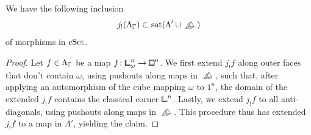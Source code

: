 \begin{lemma}\label{lem:different-liftings-comparison}
We have the following inclusion
\[
    j_!(\Lambda_{\bbGamma})\subset\mathrm{sat}(\Lambda'\cup\bprism)
\]
of morphisms in $\mathrm{cSet}$.
\end{lemma}

\begin{proof}
Let $f\in\Lambda_{\bbGamma}$ be a map $f\colon{\bbcor}^n_\omega\to{\bblox}^n$.
We first extend $j_!f$ along outer faces that don't contain $\omega$,
using pushouts along maps in $\bprism$,
such that, after applying an automorphism of the cube mapping $\omega$ to $1^n$,
the domain of the extended $j_!f$ contains the classical corner ${\bbcor}^n$.
Lastly, we extend $j_!f$ to all anti-diagonals, using pushouts along maps in $\bprism$.
This procedure thus has extended $j_!f$ to a map in $\Lambda'$, yielding the claim.


\end{proof}
